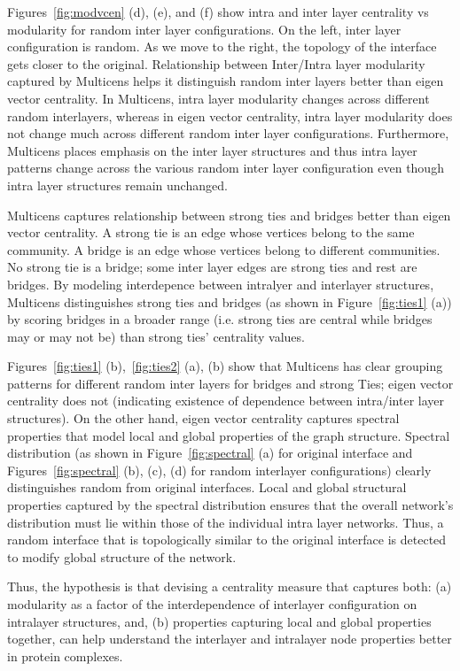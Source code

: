 \documentclass[10pt,letterpaper]{article}
\begin{document}
Figures~\ref{fig:modvcen} (d), (e), and (f) show intra and inter layer centrality vs modularity for random inter layer configurations. On the left, inter layer configuration is random. As we move to the right, the topology of the interface gets closer to the original. Relationship between Inter/Intra layer modularity captured by Multicens helps it distinguish random inter layers better than eigen vector centrality. In Multicens, intra layer modularity changes across different random interlayers, whereas in eigen vector centrality, intra layer modularity does not change much across different random inter layer configurations. Furthermore, Multicens places emphasis on the inter layer structures and thus intra layer patterns change across the various random inter layer configuration even though intra layer structures remain unchanged. 

Multicens captures relationship between strong ties and bridges better than eigen vector centrality. A strong tie is an edge whose vertices belong to the same community. A bridge is an edge whose vertices belong to different communities. No strong tie is a bridge; some inter layer edges are strong ties and rest are bridges. By modeling interdepence between intralyer and interlayer structures, Multicens distinguishes strong ties and bridges (as shown in Figure~\ref{fig:ties1} (a)) by scoring bridges in a broader range (i.e. strong ties are central while bridges may or may not be) than strong ties' centrality values. 


Figures~\ref{fig:ties1} (b),~\ref{fig:ties2} (a), (b) show that Multicens has clear grouping patterns for different random inter layers for bridges and strong Ties; eigen vector centrality does not (indicating existence of dependence between intra/inter layer structures). On the other hand, eigen vector centrality captures spectral properties that model local and global properties of the graph structure. Spectral distribution (as shown in Figure~\ref{fig:spectral} (a) for original interface and Figures~\ref{fig:spectral} (b), (c), (d) for random interlayer configurations) clearly distinguishes random from original interfaces. Local and global structural properties captured by the spectral distribution ensures that the overall network's distribution must lie within those of the individual intra layer networks. Thus, a random interface that is topologically similar to the original interface is detected to modify global structure of the network. 

Thus, the hypothesis is that devising a centrality measure that captures both: (a) modularity as a factor of the interdependence of interlayer configuration on intralayer structures, and, (b) properties capturing local and global properties together, can help understand the interlayer and intralayer node properties better in protein complexes. 
\end{document}
